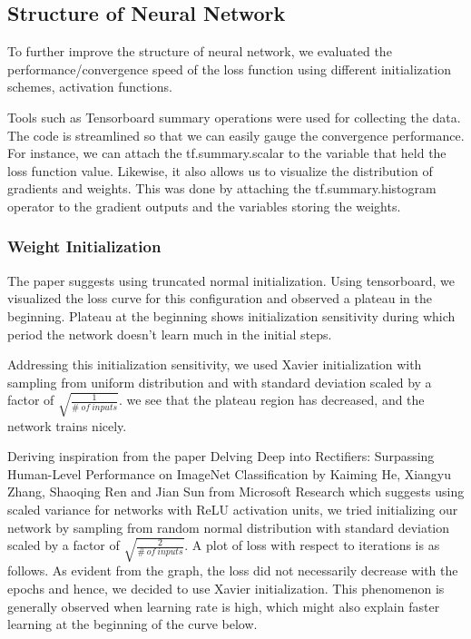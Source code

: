 \documentclass[11pt]{paper}
\begin{document}
		\subsection{Structure of Neural Network}
		To further improve the structure of neural network, we evaluated the performance/convergence speed of the loss function using different initialization schemes, activation functions. 
		
		Tools such as Tensorboard summary operations were used for collecting the data. The code is streamlined so that we can easily gauge the convergence performance. For instance, we can attach the tf.summary.scalar to the variable that held the loss function value.  Likewise, it also allows us to visualize the distribution of gradients and weights. This was done by attaching the tf.summary.histogram operator to the gradient outputs and the variables storing the weights. 

		\subsubsection{Weight Initialization}
		The paper suggests using truncated normal initialization. Using tensorboard, we visualized the loss curve for this configuration and observed a plateau in the beginning. Plateau at the beginning shows initialization sensitivity during which period the network doesn’t learn much in the initial steps.


		Addressing this initialization sensitivity, we used Xavier initialization with sampling from uniform distribution and with standard deviation scaled by a factor of $\sqrt{\frac{1}{\# \ of\ inputs}} $. we see that the plateau region has decreased, and the network trains nicely.


		Deriving inspiration from the paper Delving Deep into Rectifiers: Surpassing Human-Level Performance on ImageNet Classification by Kaiming He, Xiangyu Zhang, Shaoqing Ren and Jian Sun from Microsoft Research which suggests using scaled variance for networks with ReLU activation units, we tried initializing our network by sampling from random normal distribution with standard deviation scaled  by a factor of $\sqrt{\frac{2}{\# \ of\ inputs}} $. A plot of loss with respect to iterations is as follows. As evident from the graph, the loss did not necessarily decrease with the epochs and hence, we decided to use Xavier initialization. This phenomenon is generally observed when learning rate is high, which might also explain faster learning at the beginning of the curve below.
\end{document}
